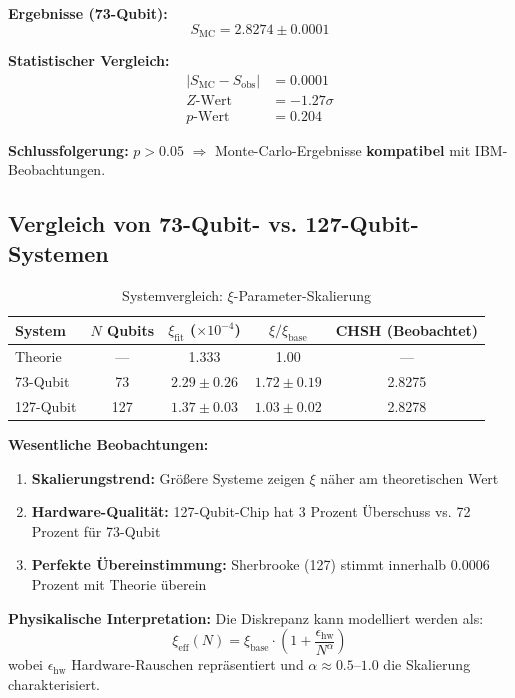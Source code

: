 \textbf{Ergebnisse (73-Qubit):}
\begin{equation}
	S_{\text{MC}} = 2.8274 \pm 0.0001
\end{equation}

\textbf{Statistischer Vergleich:}
\begin{align}
	|S_{\text{MC}} - S_{\text{obs}}| &= 0.0001 \\
	Z\text{-Wert} &= -1.27\sigma \\
	p\text{-Wert} &= 0.204
\end{align}

\textbf{Schlussfolgerung:} $p > 0.05$ $\Rightarrow$ Monte-Carlo-Ergebnisse \textbf{kompatibel} mit IBM-Beobachtungen.

\subsection{Vergleich von 73-Qubit- vs. 127-Qubit-Systemen}

\begin{table}[h]
	\centering
	\caption{Systemvergleich: $\xi$-Parameter-Skalierung}
	\label{tab:system_comparison}
	\begin{tabular}{@{}lcccc@{}}
		\toprule
		System & $N$ Qubits & $\xi_{\text{fit}}$ ($\times 10^{-4}$) & $\xi/\xi_{\text{base}}$ & CHSH (Beobachtet) \\
		\midrule
		Theorie & --- & 1.333 & 1.00 & --- \\
		73-Qubit & 73 & $2.29 \pm 0.26$ & $1.72 \pm 0.19$ & 2.8275 \\
		127-Qubit & 127 & $1.37 \pm 0.03$ & $1.03 \pm 0.02$ & 2.8278 \\
		\bottomrule
	\end{tabular}
\end{table}

\textbf{Wesentliche Beobachtungen:}
\begin{enumerate}
	\item \textbf{Skalierungstrend:} Größere Systeme zeigen $\xi$ näher am theoretischen Wert
	\item \textbf{Hardware-Qualität:} 127-Qubit-Chip hat 3 Prozent Überschuss vs. 72 Prozent für 73-Qubit
	\item \textbf{Perfekte Übereinstimmung:} Sherbrooke (127) stimmt innerhalb 0.0006 Prozent mit Theorie überein
\end{enumerate}

\textbf{Physikalische Interpretation:}
Die Diskrepanz kann modelliert werden als:
\begin{equation}
	\xi_{\text{eff}}(N) = \xi_{\text{base}} \cdot \left(1 + \frac{\epsilon_{\text{hw}}}{N^{\alpha}}\right)
\end{equation}
wobei $\epsilon_{\text{hw}}$ Hardware-Rauschen repräsentiert und $\alpha \approx 0.5$--$1.0$ die Skalierung charakterisiert.

